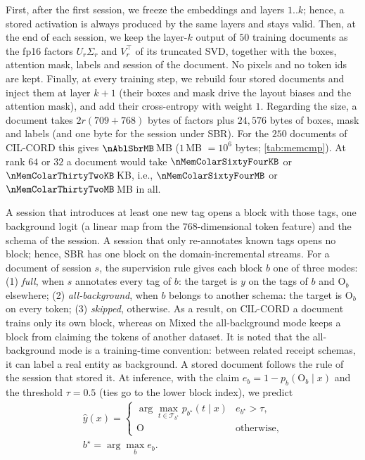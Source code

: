  First, after the first session, we freeze the embeddings and layers $1..k$; hence, a stored activation is always produced by the same layers and stays valid. Then, at the end of each session, we keep the layer-$k$ output of $50$ training documents as the fp16 factors $U_r\Sigma_r$ and $V_r^{\top}$ of its truncated SVD, together with the boxes, attention mask, labels and session of the document. No pixels and no token ids are kept. Finally, at every training step, we rebuild four stored documents and inject them at layer $k{+}1$ (their boxes and mask drive the layout biases and the attention mask), and add their cross-entropy with weight $1$. Regarding the size, a document takes $2r(709{+}768)$ bytes of factors plus $24{,}576$ bytes of boxes, mask and labels (and one byte for the session under SBR). For the $250$ documents of CIL-CORD this gives $\nAblSbrMB$\,MB ($1$\,MB $=10^6$ bytes; \cref{tab:memcmp}). At rank $64$ or $32$ a document would take $\nMemColarSixtyFourKB$ or $\nMemColarThirtyTwoKB$\,KB, i.e., $\nMemColarSixtyFourMB$ or $\nMemColarThirtyTwoMB$\,MB in all.

 A session that introduces at least one new tag opens a block with those tags, one background logit (a linear map from the $768$-dimensional token feature) and the schema of the session. A session that only re-annotates known tags opens no block; hence, SBR has one block on the domain-incremental streams. For a document of session $s$, the supervision rule gives each block $b$ one of three modes: (1) \emph{full}, when $s$ annotates every tag of $b$: the target is $y$ on the tags of $b$ and $\mathrm{O}_b$ elsewhere; (2) \emph{all-background}, when $b$ belongs to another schema: the target is $\mathrm{O}_b$ on every token; (3) \emph{skipped}, otherwise. As a result, on CIL-CORD a document trains only its own block, whereas on Mixed the all-background mode keeps a block from claiming the tokens of another dataset. It is noted that the all-background mode is a training-time convention: between related receipt schemas, it can label a real entity as background. A stored document follows the rule of the session that stored it. At inference, with the claim $e_b=1-p_b(\mathrm{O}_b\mid x)$ and the threshold $\tau{=}0.5$ (ties go to the lower block index), we predict
\begin{equation}
\begin{gathered}
\hat y(x)=\begin{cases}\arg\max_{t\in\mathcal{T}_{b^\star}}p_{b^\star}(t\mid x) & e_{b^\star}>\tau,\\ \mathrm{O} & \text{otherwise,}\end{cases}\\
b^\star=\arg\max_b e_b.
\end{gathered}
\label{eq:infer}
\end{equation}

